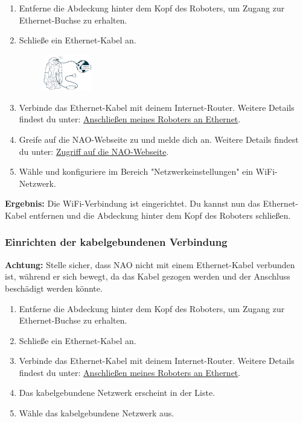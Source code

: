 \begin{enumerate}
    \item Entferne die Abdeckung hinter dem Kopf des Roboters, um Zugang zur Ethernet-Buchse zu erhalten.
    \item Schließe ein Ethernet-Kabel an.
    \begin{figure}[h]
        \centering
        \includegraphics[width=0.2\textwidth]{../images/pluginEthernatCabel.png}
        \label{fig:pluginEthernatCabel}
    \end{figure}
    \item Verbinde das Ethernet-Kabel mit deinem Internet-Router. Weitere Details findest du unter: \href{https://doc.aldebaran.com/2-1/nao/nao-connecting.html}{Anschließen meines Roboters an Ethernet}.
    \item Greife auf die NAO-Webseite zu und melde dich an. Weitere Details findest du unter: \href{https://doc.aldebaran.com/2-1/nao/nao-connecting.html}{Zugriff auf die NAO-Webseite}.
    \item Wähle und konfiguriere im Bereich "Netzwerkeinstellungen" ein WiFi-Netzwerk.
\end{enumerate}
\textbf{Ergebnis:} Die WiFi-Verbindung ist eingerichtet. Du kannst nun das Ethernet-Kabel entfernen und die Abdeckung hinter dem Kopf des Roboters schließen.

\subsubsection{Einrichten der kabelgebundenen Verbindung}
\textbf{Achtung:} Stelle sicher, dass NAO nicht mit einem Ethernet-Kabel verbunden ist, während er sich bewegt, da das Kabel gezogen werden und der Anschluss beschädigt werden könnte.
\begin{enumerate}
    \item Entferne die Abdeckung hinter dem Kopf des Roboters, um Zugang zur Ethernet-Buchse zu erhalten.
    \item Schließe ein Ethernet-Kabel an.
    \item Verbinde das Ethernet-Kabel mit deinem Internet-Router. Weitere Details findest du unter: \href{https://doc.aldebaran.com/2-1/nao/nao-connecting.html}{Anschließen meines Roboters an Ethernet}.
    \item Das kabelgebundene Netzwerk erscheint in der Liste.
    \item Wähle das kabelgebundene Netzwerk aus.
\end{enumerate}
